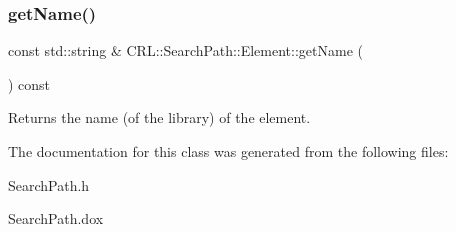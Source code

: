 \subsubsection{\texorpdfstring{get\+Name()}{getName()}}
{\footnotesize\ttfamily const std\+::string \& C\+R\+L\+::\+Search\+Path\+::\+Element\+::get\+Name (\begin{DoxyParamCaption}{ }\end{DoxyParamCaption}) const\hspace{0.3cm}{\ttfamily [inline]}}

\begin{DoxyReturn}{Returns}
the {\ttfamily name} (of the library) of the element. 
\end{DoxyReturn}


The documentation for this class was generated from the following files\+:\begin{DoxyCompactItemize}
\item 
Search\+Path.\+h\item 
Search\+Path.\+dox\end{DoxyCompactItemize}
